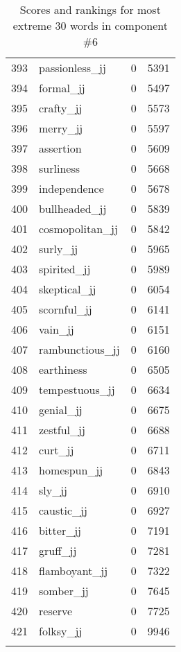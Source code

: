 \begin{longtable}[!htbp]{| rlr@{.}l |}
    393 & passionless\_jj & 0 & 5391 \\
    394 & formal\_jj & 0 & 5497 \\
    395 & crafty\_jj & 0 & 5573 \\
    396 & merry\_jj & 0 & 5597 \\
    397 & assertion & 0 & 5609 \\
    398 & surliness & 0 & 5668 \\
    399 & independence & 0 & 5678 \\
    400 & bullheaded\_jj & 0 & 5839 \\
    401 & cosmopolitan\_jj & 0 & 5842 \\
    402 & surly\_jj & 0 & 5965 \\
    403 & spirited\_jj & 0 & 5989 \\
    404 & skeptical\_jj & 0 & 6054 \\
    405 & scornful\_jj & 0 & 6141 \\
    406 & vain\_jj & 0 & 6151 \\
    407 & rambunctious\_jj & 0 & 6160 \\
    408 & earthiness & 0 & 6505 \\
    409 & tempestuous\_jj & 0 & 6634 \\
    410 & genial\_jj & 0 & 6675 \\
    411 & zestful\_jj & 0 & 6688 \\
    412 & curt\_jj & 0 & 6711 \\
    413 & homespun\_jj & 0 & 6843 \\
    414 & sly\_jj & 0 & 6910 \\
    415 & caustic\_jj & 0 & 6927 \\
    416 & bitter\_jj & 0 & 7191 \\
    417 & gruff\_jj & 0 & 7281 \\
    418 & flamboyant\_jj & 0 & 7322 \\
    419 & somber\_jj & 0 & 7645 \\
    420 & reserve & 0 & 7725 \\
    421 & folksy\_jj & 0 & 9946 \\
    \hline
    \caption{Scores and rankings for most extreme 30 words in component \#6} \\
\end{longtable}
